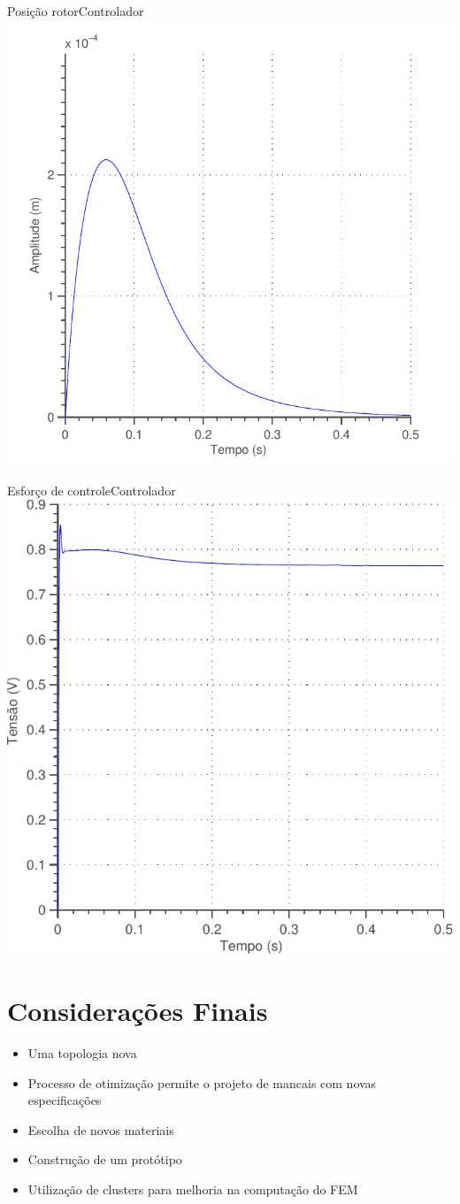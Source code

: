 \documentclass{beamer}
\begin{document}
\begin{frame}{Posição rotor}{Controlador}
\centering
\includegraphics[width=0.7\linewidth]{controle/pid_nlinear_condicao_inicial_posicao}
\end{frame}

\begin{frame}{Esforço de controle}{Controlador}
\centering
\includegraphics[width=0.7\linewidth]{controle/pid_nlinear_condicao_inicial_esforco}
\end{frame}

\section{Considerações Finais}

\begin{frame}

\begin{itemize}
\item Uma topologia nova
\item Processo de otimização permite o projeto de mancais com novas especificações
\item Escolha de novos materiais
\item Construção de um protótipo
\item Utilização de clusters para melhoria na computação do FEM
\end{itemize}

\end{frame}

\end{document}
